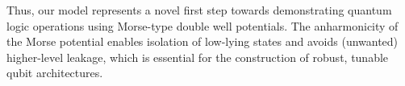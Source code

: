 \documentclass{subfiles}
\begin{document}
Thus, our model represents a novel first step towards demonstrating quantum logic operations using Morse-type double well potentials. The anharmonicity of the Morse potential enables isolation of low-lying states and avoids (unwanted) higher-level leakage, which is essential for the construction of robust, tunable qubit architectures\cite{nielsen2010quantum}.
\end{document}
